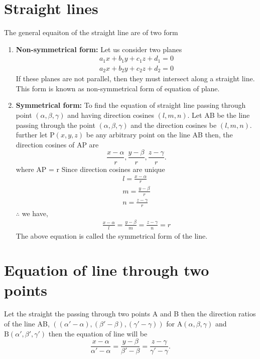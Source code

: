 \documentclass{article}
\theoremstyle{definition}
\begin{document}
\section*{Straight lines}
The general equaiton of the straight line are of two form 
\begin{enumerate}
	\item \textbf{Non-symmetrical form:}
		Let us consider two planes 
	\begin{align*}
		a_{1}x+b_{1}y + c_{1}z +d_{1} = 0 \tag{1}\\
		a_{2}x+b_{2}y + c_{2}z +d_{2} = 0 \tag{2}
	\end{align*}
	If these planes are not parallel, then they must intersect along a straight line. \newline
	This form is known as non-symmetrical form of equation of plane.
	\item \textbf{Symmetrical form:} To find the equation of straight line passing through point $\text{}(\alpha, \beta, \gamma)$ and having direction cosines $\text{}(l, m, n)$. \newline
		Let AB be the line passing through the point $\text{}(\alpha, \beta, \gamma)$ and the direction cosines be $\text{}(l, m, n)$. \newline
		further let $\text{P}(x, y, z)$ be any arbitrary point on the line AB then, the direction cosines of AP are \[
		\frac{x-\alpha}{r}, \frac{y-\beta}{r}, \frac{z-\gamma}{r}
		.\] where AP = r \newline
		Since direction cosines are unique 
		\begin{align*}
			l = \frac{x-\alpha}{r} \\
			m = \frac{y - \beta}{r} \\
			n = \frac{z - \gamma}{r} 
		\end{align*}
		$\therefore$ we have, 
		\begin{align*}
			\boxed{\frac{x-\alpha}{l} =  \frac{y - \beta}{m} = \frac{z - \gamma}{n} = r}
		\end{align*}
The above equation is called the symmetrical form of the line.
\end{enumerate}
\section*{Equation of line through two points}
	Let the straight the passing through two points A and B then the direction ratios of the line AB, $\text{}((\alpha' - \alpha), (\beta' - \beta), (\gamma' - \gamma))$ for $\text{A}(\alpha, \beta, \gamma)$ and $\text{B}(\alpha', \beta', \gamma')$ \newline
	then the equation of line will be 
	\[
		\boxed{\frac{x-\alpha}{\alpha'-\alpha} = \frac{y -\beta}{\beta'-\beta} = \frac{z-\gamma}{\gamma'-\gamma}}
	.\]
\end{document}
